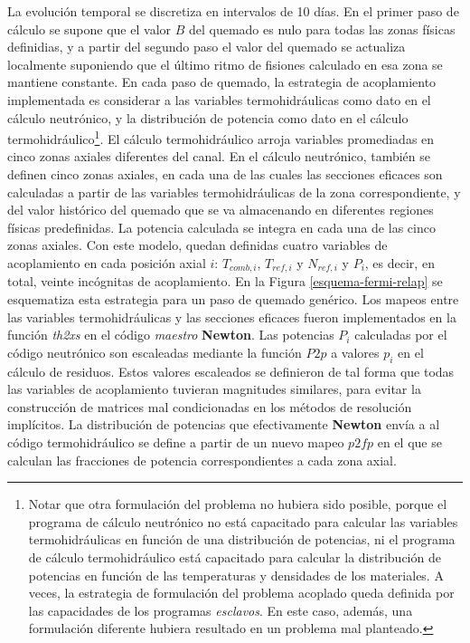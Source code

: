 La evolución temporal se discretiza en intervalos de 10 días.
En el primer paso de cálculo se supone que el valor $B$ del quemado es nulo para todas las zonas físicas definidias,
y a partir del segundo paso el valor del quemado se actualiza localmente suponiendo que el último ritmo de fisiones calculado en esa zona se mantiene constante.
En cada paso de quemado,
la estrategia de acoplamiento implementada es considerar a las variables termohidráulicas como dato en el cálculo neutrónico,
y la distribución de potencia como dato en el cálculo termohidráulico\footnote{
Notar que otra formulación del problema no hubiera sido posible,
porque el programa de cálculo neutrónico no está capacitado para calcular las variables termohidráulicas en función de una distribución de potencias,
ni el programa de cálculo termohidráulico está capacitado para calcular la distribución de potencias en función de las temperaturas y densidades de los materiales.
A veces, la estrategia de formulación del problema acoplado queda definida por las capacidades de los programas \textit{esclavos}.
En este caso, además, una formulación diferente hubiera resultado en un problema mal planteado.
}.
El cálculo termohidráulico arroja variables promediadas en cinco zonas axiales diferentes del canal.
En el cálculo neutrónico, también se definen cinco zonas axiales,
en cada una de las cuales las secciones eficaces son calculadas a partir de las variables termohidráulicas de la zona correspondiente,
y del valor histórico del quemado que se va almacenando en diferentes regiones físicas predefinidas.
La potencia calculada se integra en cada una de las cinco zonas axiales.
Con este modelo, quedan definidas cuatro variables de acoplamiento en cada posición axial $i$: $T_{comb,i}$, $T_{ref,i}$ y $N_{ref,i}$ y $P_i$,
es decir, en total, veinte incógnitas de acoplamiento.
En la Figura \ref{esquema-fermi-relap} se esquematiza esta estrategia para un paso de quemado genérico.
Los mapeos entre las variables termohidráulicas y las secciones eficaces fueron implementados en la función \textit{th2xs} en el código \textit{maestro} \textbf{Newton}.
Las potencias $P_i$ calculadas por el código neutrónico son escaleadas mediante la función $P2p$ a valores $p_i$ en el cálculo de residuos.
Estos valores escaleados se definieron de tal forma que todas las variables de acoplamiento tuvieran magnitudes similares,
para evitar la construcción de matrices mal condicionadas en los métodos de resolución implícitos.
La distribución de potencias que efectivamente \textbf{Newton} envía a al código termohidráulico se define a partir de un nuevo mapeo $p2fp$
en el que se calculan las fracciones de potencia correspondientes a cada zona axial.

